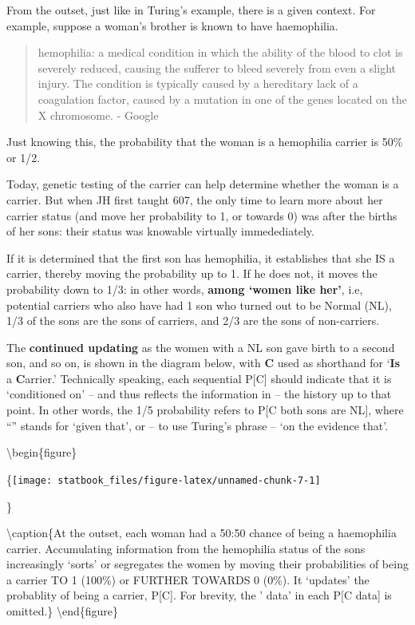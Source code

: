 \documentclass[]{book}
\begin{document}
From the outset, just like in Turing's example, there is a given context. For example, suppose a woman's brother is known to have haemophilia.

\begin{quote}
hemophilia: a medical condition in which the ability of the blood to clot is severely reduced, causing the sufferer to bleed severely from even a slight injury. The condition is typically caused by a hereditary lack of a coagulation factor, caused by a mutation in one of the genes located on the X chromosome. - Google
\end{quote}

Just knowing this, the probability that the woman is a hemophilia carrier is 50\% or 1/2.

Today, genetic testing of the carrier can help determine whether the woman is a carrier. But when JH first taught 607, the only time to learn more about her carrier status (and move her probability to 1, or towards 0) was after the births of her sons: their status was knowable virtually immedediately.

If it is determined that the first son has hemophilia, it establishes that she IS a carrier, thereby moving the probability up to 1. If he does not, it moves the probability down to 1/3: in other words, \textbf{among `women like her'}, i.e, potential carriers who also have had 1 son who turned out to be Normal (NL), 1/3 of the sons are the sons of carriers, and 2/3 are the sons of non-carriers.

The \textbf{continued updating} as the women with a NL son gave birth to a second son, and so on, is shown in the diagram below, with \textbf{C} used as shorthand for `\textbf{Is} a \textbf{C}arrier.' Technically speaking, each sequential P{[}C{]} should indicate that it is `conditioned on' -- and thus reflects the information in -- the history up to that point. In other words, the 1/5 probability refers to P{[}C \textbar{} both sons are NL{]}, where ``\textbar{}'' stands for `given that', or -- to use Turing's phrase -- `on the evidence that'.

\textbackslash{}begin\{figure\}

\{\centering \texttt{[image: statbook\_files/figure-latex/unnamed-chunk-7-1]}

\}

\textbackslash{}caption\{At the outset, each woman had a 50:50 chance of being a haemophilia carrier. Accumulating information from the hemophilia status of the sons increasingly `sorts' or segregates the women by moving their probabilities of being a carrier TO 1 (100\%) or FURTHER TOWARDS 0 (0\%). It `updates' the probablity of being a carrier, P{[}C{]}. For brevity, the ' \textbar{} data' in each P{[}C \textbar{} data{]} is omitted.\}\label{fig:unnamed-chunk-7}
\textbackslash{}end\{figure\}
\end{document}

